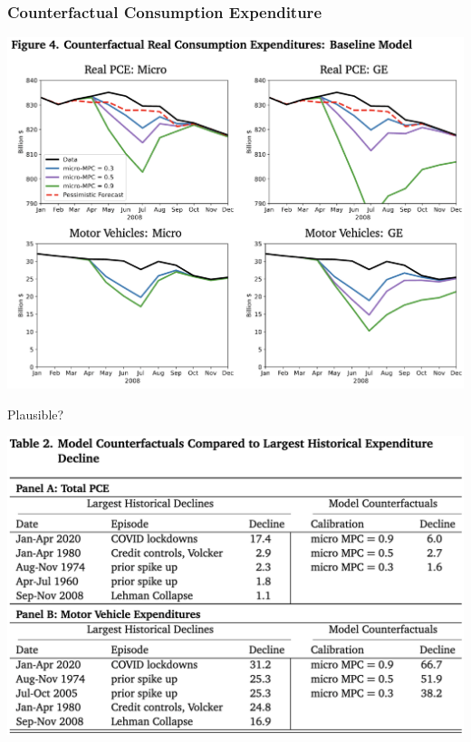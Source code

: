 \documentclass[english,xcolor=svgnames]{beamer}
\begin{document}
\begin{frame}[label=baselineforecasts]
\frametitle{Counterfactual Consumption Expenditure}

\begin{center}
	\includegraphics[scale=0.4]{figures/ORWFIG4.png}
 \end{center} 
\end{frame}

\begin{frame}{Plausible?}
	
	\begin{center}
		\includegraphics[scale=0.4]{figures/ORWTAB2.png}
	 \end{center} 
\end{frame}
\end{document}
